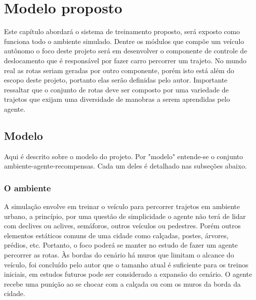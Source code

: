 \chapter{Modelo proposto}\label{cap:proposta}
Este capítulo abordará o sistema de treinamento proposto, será exposto como funciona todo o ambiente simulado. Dentre os módulos que compõe um veículo autônomo o foco deste projeto será em desenvolver o componente de controle de deslocamento que é responsável por fazer carro percorrer um trajeto. No mundo real as rotas seriam geradas por outro componente, porém isto está além do escopo deste projeto, portanto elas serão definidas pelo autor. Importante ressaltar que o conjunto de rotas deve ser composto por uma variedade de trajetos que exijam uma diversidade de manobras a serem aprendidas pelo agente.

\section{Modelo}\label{modelo}
Aqui é descrito sobre o modelo do projeto. Por "modelo" entende-se o conjunto ambiente-agente-recompensas. Cada um deles é detalhado nas subseções abaixo.

\subsection{O ambiente}
A simulação envolve em treinar o veículo para percorrer trajetos em ambiente urbano, a princípio, por uma questão de simplicidade o agente não terá de lidar com declives ou aclives, semáforos, outros veículos ou pedestres. Porém outros elementos estáticos comuns de uma cidade como calçadas, postes, árvores, prédios, etc. Portanto, o foco poderá se manter no estudo de fazer um agente percorrer as rotas. Às bordas do cenário há muros que limitam o alcance do veículo, foi concluído pelo autor que o tamanho atual é suficiente para os treinos iniciais, em estudos futuros pode ser considerado a expansão do cenário. O agente recebe uma punição ao se chocar com a calçada ou com os muros da borda da cidade.

